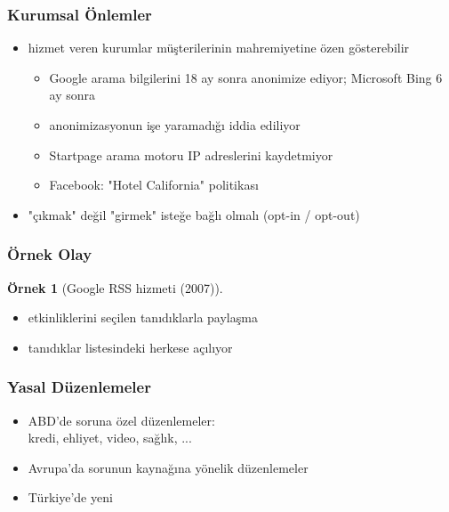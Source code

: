 \documentclass[dvipsnames]{beamer}
\theoremstyle{definition}
\theoremstyle{example}
\newtheorem{ornek}[theorem]{Örnek}
\theoremstyle{plain}
\begin{document}
\begin{frame}
  \frametitle{Kurumsal Önlemler}

  \begin{itemize}
    \item hizmet veren kurumlar müşterilerinin mahremiyetine özen gösterebilir
    \begin{itemize}
      \item Google arama bilgilerini 18 ay sonra anonimize ediyor;
        Microsoft Bing 6 ay sonra
      \item anonimizasyonun işe yaramadığı iddia ediliyor
      \item Startpage arama motoru IP adreslerini kaydetmiyor
      \item Facebook: "Hotel California" politikası
    \end{itemize}

    \pause
    \item "çıkmak" değil "girmek" isteğe bağlı olmalı (opt-in / opt-out)
  \end{itemize}
\end{frame}

\begin{frame}
  \frametitle{Örnek Olay}

  \begin{ornek}[Google RSS hizmeti (2007)]
    \begin{itemize}
      \item etkinliklerini seçilen tanıdıklarla paylaşma
      \item tanıdıklar listesindeki herkese açılıyor
    \end{itemize}
  \end{ornek}
\end{frame}

\begin{frame}
  \frametitle{Yasal Düzenlemeler}

  \begin{itemize}
    \item ABD'de soruna özel düzenlemeler:\\
      kredi, ehliyet, video, sağlık, ...

    \pause
    \item Avrupa'da sorunun kaynağına yönelik düzenlemeler

    \pause
    \item Türkiye'de yeni
  \end{itemize}
\end{frame}
\end{document}
